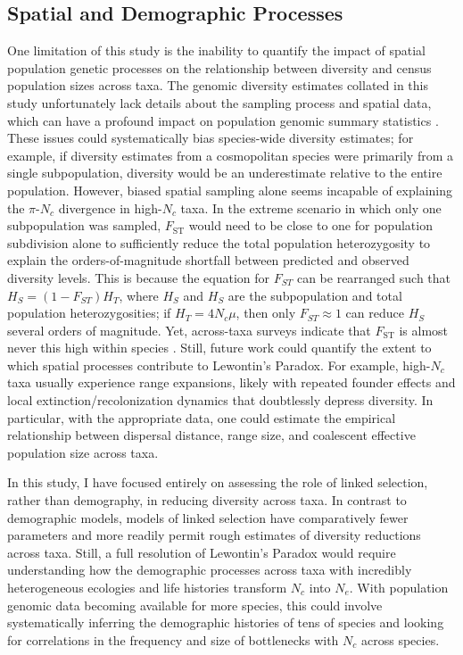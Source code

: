 \documentclass[9pt,lineno]{elife}
\begin{document}
\subsection{Spatial and Demographic Processes}

One limitation of this study is the inability to quantify the impact of spatial
population genetic processes on the relationship between diversity and census
population sizes across taxa. The genomic diversity estimates collated in this
study unfortunately lack details about the sampling process and spatial data,
which can have a profound impact on population genomic summary statistics
\citep{Battey2020-lc}. These issues could systematically bias species-wide
diversity estimates; for example, if diversity estimates from a cosmopolitan
species were primarily from a single subpopulation, diversity would be an
underestimate relative to the entire population. However, biased spatial
sampling alone seems incapable of explaining the $\pi$-$N_c$ divergence in
high-$N_c$ taxa. In the extreme scenario in which only one subpopulation was
sampled, $F_\text{ST}$ would need to be close to one for population subdivision
alone to sufficiently reduce the total population heterozygosity to explain the
orders-of-magnitude shortfall between predicted and observed diversity levels.
This is because the equation for $F_{ST}$ can be rearranged such that $H_S =
(1-F_{ST})H_T$, where $H_S$ and $H_S$ are the subpopulation and total
population heterozygosities; if $H_T = 4N_c\mu$, then only $F_{ST} \approx 1$
can reduce $H_S$ several orders of magnitude. Yet, across-taxa surveys indicate
that $F_\text{ST}$ is almost never this high within species
\citep{Roux2016-lm}.  Still, future work could quantify the extent to which
spatial processes contribute to Lewontin's Paradox. For example, high-$N_c$
taxa usually experience range expansions, likely with repeated founder effects
and local extinction/recolonization dynamics that doubtlessly depress
diversity. In particular, with the appropriate data, one could estimate the
empirical relationship between dispersal distance, range size, and coalescent
effective population size across taxa.

In this study, I have focused entirely on assessing the role of linked
selection, rather than demography, in reducing diversity across taxa. In
contrast to demographic models, models of linked selection have comparatively
fewer parameters and more readily permit rough estimates of diversity
reductions across taxa. Still, a full resolution of Lewontin's Paradox would
require understanding how the demographic processes across taxa with incredibly
heterogeneous ecologies and life histories transform $N_c$ into $N_e$. With
population genomic data becoming available for more species, this could involve
systematically inferring the demographic histories of tens of species and
looking for correlations in the frequency and size of bottlenecks with $N_c$
across species.
\end{document}
